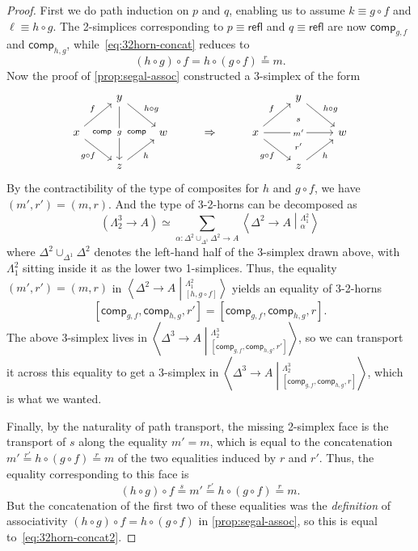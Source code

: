 \documentclass[12pt]{amsart}
\theoremstyle{plain}
\theoremstyle{definition}
\theoremstyle{remark}
\numberwithin{equation}{section}
\newcommand{\ndexten}[4]{\left\langle #1 \to #2 \middle|^{#3}_{#4}\right\rangle}
\newcommand{\jdeq}{\equiv}
\newcommand{\refl}{\mathsf{refl}}
\newcommand{\iscomp}[2]{\mathsf{comp}_{#1,#2}}
\begin{document}
\begin{proof}
  First we do path induction on $p$ and $q$, enabling us to assume $k\jdeq g\circ f$ and $\ell\jdeq h\circ g$.
  The 2-simplices corresponding to $p\jdeq \refl$ and $q\jdeq \refl$ are now $\iscomp g f$ and $\iscomp h g$, while~\eqref{eq:32horn-concat} reduces to
  \begin{equation}
    (h\circ g) \circ f = h \circ (g\circ f) \overset r= m.\label{eq:32horn-concat2}
  \end{equation}
  Now the proof of \cref{prop:segal-assoc} constructed a 3-simplex of the form
  \[
  \begin{tikzcd}
    & y \ar[dd,"g" description] \ar[dr,"h\circ g"] &&&& y \ar[dr,"h\circ g"] \\
    x \ar[ur,"f"] \ar[dr,"g\circ f"'] \ar[rr,phantom,"\scriptstyle \mathsf{comp}" near start, "\scriptstyle \mathsf{comp}" near end] && w & \Rightarrow & x \ar[ur,"f"] \ar[dr,"g\circ f"'] \ar[rr,"m'" description] && w \\
    & z \ar[ur,"h"'] &&&& z \ar[ur,"h"'] \ar[uu,phantom,"\scriptstyle r'" near start,"\scriptstyle s" near end]
  \end{tikzcd}
  \]
  By the contractibility of the type of composites for $h$ and $g\circ f$, we have $(m',r') = (m,r)$.
  And the type of 3-2-horns can be decomposed as
  \[ (\Lambda^3_2\to A) \simeq \sum_{\alpha : \Delta^2 \cup_{\Delta^1} \Delta^2 \to A} \ndexten{\Delta^2}{A}{\Lambda^2_1}{\alpha} \]
  where $\Delta^2 \cup_{\Delta^1} \Delta^2$ denotes the left-hand half of the 3-simplex drawn above, with $\Lambda^2_1$ sitting inside it as the lower two 1-simplices.
  Thus, the equality $(m',r') = (m,r)$ in $\ndexten{\Delta^2}{A}{\Lambda^2_1}{[h,g\circ f]}$ yields an equality of 3-2-horns
  \[[\iscomp g f,\iscomp h g,r'] = [\iscomp g f,\iscomp h g,r].\]
  The above 3-simplex lives in $\ndexten{\Delta^3}{A}{\Lambda^3_2}{[\iscomp g f,\iscomp h g,r']}$, so we can transport it across this equality to get a 3-simplex in $\ndexten{\Delta^3}{A}{\Lambda^3_2}{[\iscomp g f,\iscomp h g,r]}$, which is what we wanted.

  Finally, by the naturality of path transport, the missing 2-simplex face is the transport of $s$ along the equality $m'=m$, which is equal to the concatenation $m' \overset {r'}= h\circ (g\circ f) \overset{r}= m$ of the two equalities induced by $r$ and $r'$.
  Thus, the equality corresponding to this face is
  \[ (h\circ g) \circ f \overset s= m' \overset {r'}= h\circ (g\circ f) \overset{r}= m. \]
  But the concatenation of the first two of these equalities was the \emph{definition} of associativity $(h\circ g) \circ f = h \circ (g\circ f)$ in \cref{prop:segal-assoc}, so this is equal to~\eqref{eq:32horn-concat2}.
\end{proof}
\end{document}
